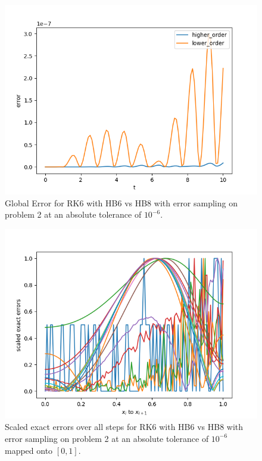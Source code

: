 \begin{figure}[H]
\centering
\includegraphics[width=0.7\linewidth]{./figures/rk6_with_hb6_hb8_sampling_p2_global_error}
\caption{Global Error for RK6 with HB6 vs HB8 with error sampling on problem 2 at an absolute tolerance of $10^{-6}$.}
\label{fig:rk6_with_hb6_hb8_sampling_p2_global_error}
\end{figure}

\begin{figure}[H]
\centering
\includegraphics[width=0.7\linewidth]{./figures/rk6_with_hb6_hb8_sampling_p2_scaled_errors}
\caption{Scaled exact errors over all steps for RK6 with HB6 vs HB8 with error sampling on problem 2 at an absolute tolerance of $10^{-6}$ mapped onto $[0, 1]$.}
\label{fig:rk6_with_hb6_hb8_sampling_p2_scaled_errors}
\end{figure}

